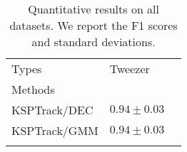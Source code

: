 \begin{table}
\centering
\caption{
Quantitative results on all datasets. We report the F1 scores and standard deviations.
}
\label{tab:results}
\begin{tabular}{llp{1.8cm}}
\toprule
Types &               Tweezer \\
Methods      &                       \\
\midrule
KSPTrack/DEC &  $\bm{0.94} \pm 0.03$ \\
KSPTrack/GMM &       $0.94 \pm 0.03$ \\
\hdashline
\bottomrule
\end{tabular}
\end{table}
